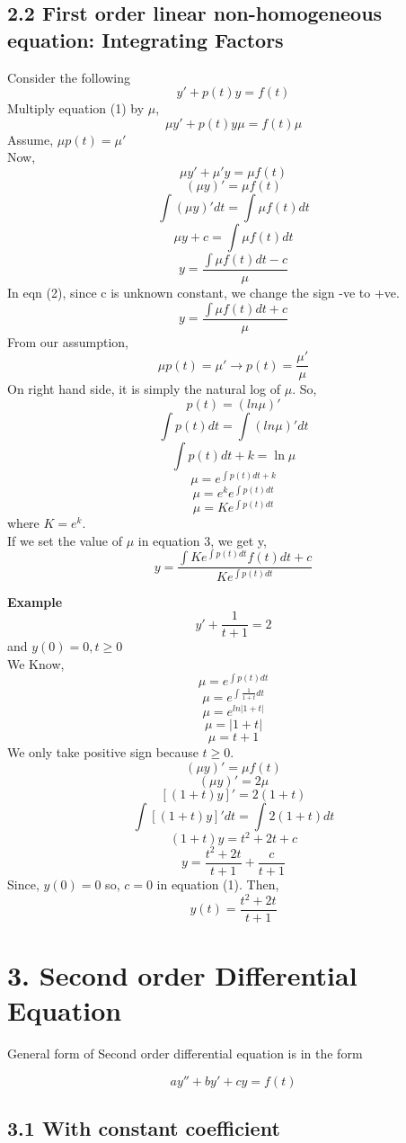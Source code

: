 \documentclass[
  11pt,
]{article}
\begin{document}
\subsection{2.2 First order linear non-homogeneous equation: Integrating
Factors}\label{first-order-linear-non-homogeneous-equation-integrating-factors}

Consider the following \[y'+p(t)y=f(t) \tag{1}\] Multiply equation (1)
by \(\mu\), \[\mu y'+p(t)y\mu=f(t)\mu\] Assume, \(\mu p(t) = \mu'\)\\
Now, \[\mu y'+\mu' y=\mu f(t)\] \[(\mu y)'=\mu f(t)\]
\[\int{(\mu y)'dt}=\int{\mu f(t)dt}\] \[\mu y +c = \int{\mu f(t)dt}\]
\[y = \frac{\int{\mu f(t)dt}-c}{\mu} \tag{2}\] In eqn (2), since c is
unknown constant, we change the sign -ve to +ve.
\[y = \frac{\int{\mu f(t)dt}+c}{\mu} \tag{3}\] From our assumption,
\[\mu p(t)=\mu' \longrightarrow p(t)=\frac{\mu'}{\mu}\] On right hand
side, it is simply the natural log of \(\mu\). So, \[p(t)=(ln\mu)'\]
\[\int{p(t)dt}=\int{(ln\mu)' dt}\] \[\int{p(t)dt+k}=\ln\mu\]
\[\mu = e^{\int{p(t)dt}+k}\] \[\mu = e^ke^{\int{p(t)dt}}\]
\[\mu = Ke^{\int{p(t)dt}} \tag{4}\] where \(K=e^k\).\\
If we set the value of \(\mu\) in equation 3, we get y,
\[y = \frac{\int{Ke^{\int{p(t)dt}} f(t)dt}+c}{Ke^{\int{p(t)dt}}} \tag{5}\]

\textbf{Example} \[y' + \frac{1}{t+1}=2\] and \(y(0)=0, t \geq 0\)\\
We Know, \[\mu = e^{\int{p(t)dt}}\] \[\mu = e^{\int{\frac{1}{1+t}dt}}\]
\[\mu = e^{ln|1+t|}\] \[\mu = |1+t|\] \[\mu = t+1\] We only take
positive sign because \(t \geq 0\). \[(\mu y)' = \mu f(t)\]
\[(\mu y)' = 2\mu\] \[[(1+t)y]'=2(1+t)\]
\[\int{[(1+t)y]'dt}=\int{2(1+t)dt}\] \[(1+t)y=t^2+2t+c\]
\[y=\frac{t^2+2t}{t+1}+\frac{c}{t+1} \tag{1}\] Since, \(y(0)=0\) so,
\(c = 0\) in equation (1). Then, \[y(t)=\frac{t^2+2t}{t+1} \tag{2}\]
\newpage

\section{3. Second order Differential
Equation}\label{second-order-differential-equation}

General form of Second order differential equation is in the form

\[
ay''+by'+cy=f(t)
\]

\subsection{3.1 With constant
coefficient}\label{with-constant-coefficient}
\end{document}
